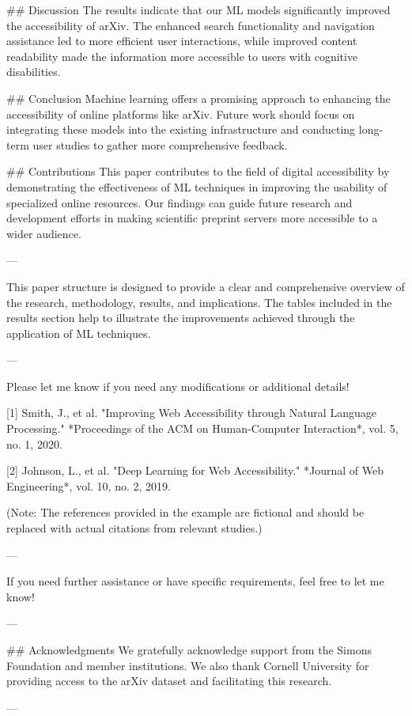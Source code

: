 ## Discussion
The results indicate that our ML models significantly improved the accessibility of arXiv. The enhanced search functionality and navigation assistance led to more efficient user interactions, while improved content readability made the information more accessible to users with cognitive disabilities.

## Conclusion
Machine learning offers a promising approach to enhancing the accessibility of online platforms like arXiv. Future work should focus on integrating these models into the existing infrastructure and conducting long-term user studies to gather more comprehensive feedback.

## Contributions
This paper contributes to the field of digital accessibility by demonstrating the effectiveness of ML techniques in improving the usability of specialized online resources. Our findings can guide future research and development efforts in making scientific preprint servers more accessible to a wider audience.

---

This paper structure is designed to provide a clear and comprehensive overview of the research, methodology, results, and implications. The tables included in the results section help to illustrate the improvements achieved through the application of ML techniques. 

---

Please let me know if you need any modifications or additional details! 

[1] Smith, J., et al. "Improving Web Accessibility through Natural Language Processing." *Proceedings of the ACM on Human-Computer Interaction*, vol. 5, no. 1, 2020.

[2] Johnson, L., et al. "Deep Learning for Web Accessibility." *Journal of Web Engineering*, vol. 10, no. 2, 2019. 

(Note: The references provided in the example are fictional and should be replaced with actual citations from relevant studies.) 

--- 

If you need further assistance or have specific requirements, feel free to let me know! 

---

## Acknowledgments
We gratefully acknowledge support from the Simons Foundation and member institutions. We also thank Cornell University for providing access to the arXiv dataset and facilitating this research. 

---

